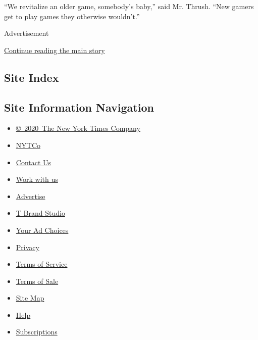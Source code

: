``We revitalize an older game, somebody's baby,'' said Mr. Thrush. ``New
gamers get to play games they otherwise wouldn't.''

Advertisement

\protect\hyperlink{after-bottom}{Continue reading the main story}

\hypertarget{site-index}{%
\subsection{Site Index}\label{site-index}}

\hypertarget{site-information-navigation}{%
\subsection{Site Information
Navigation}\label{site-information-navigation}}

\begin{itemize}
\tightlist
\item
  \href{https://help.nytimes3xbfgragh.onion/hc/en-us/articles/115014792127-Copyright-notice}{©~2020~The
  New York Times Company}
\end{itemize}

\begin{itemize}
\tightlist
\item
  \href{https://www.nytco.com/}{NYTCo}
\item
  \href{https://help.nytimes3xbfgragh.onion/hc/en-us/articles/115015385887-Contact-Us}{Contact
  Us}
\item
  \href{https://www.nytco.com/careers/}{Work with us}
\item
  \href{https://nytmediakit.com/}{Advertise}
\item
  \href{http://www.tbrandstudio.com/}{T Brand Studio}
\item
  \href{https://www.nytimes3xbfgragh.onion/privacy/cookie-policy\#how-do-i-manage-trackers}{Your
  Ad Choices}
\item
  \href{https://www.nytimes3xbfgragh.onion/privacy}{Privacy}
\item
  \href{https://help.nytimes3xbfgragh.onion/hc/en-us/articles/115014893428-Terms-of-service}{Terms
  of Service}
\item
  \href{https://help.nytimes3xbfgragh.onion/hc/en-us/articles/115014893968-Terms-of-sale}{Terms
  of Sale}
\item
  \href{https://spiderbites.nytimes3xbfgragh.onion}{Site Map}
\item
  \href{https://help.nytimes3xbfgragh.onion/hc/en-us}{Help}
\item
  \href{https://www.nytimes3xbfgragh.onion/subscription?campaignId=37WXW}{Subscriptions}
\end{itemize}
